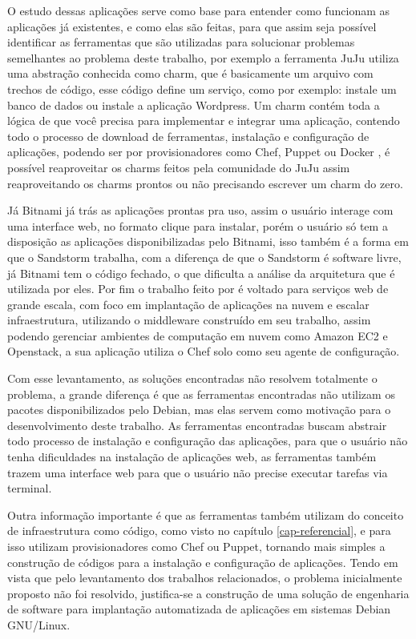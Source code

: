 O estudo dessas aplicações serve como base para entender como funcionam as aplicações
já existentes, e como elas são feitas, para que assim seja possível identificar
as ferramentas que são
utilizadas para solucionar problemas semelhantes ao problema deste
trabalho, por exemplo a ferramenta JuJu utiliza uma abstração conhecida como charm,
que é basicamente um arquivo com trechos de código, esse código define um serviço, como por exemplo: instale um banco de dados ou instale a aplicação Wordpress. Um charm
contém toda a lógica de que você precisa para implementar e integrar uma aplicação,
contendo todo o processo de download de ferramentas, instalação e configuração de
aplicações, podendo ser por provisionadores como Chef, Puppet ou Docker \cite{juju},
é possível reaproveitar os charms feitos pela comunidade do JuJu assim
reaproveitando os charms prontos ou não precisando escrever um charm do zero.

Já Bitnami já trás as aplicações
prontas pra uso, assim o usuário interage com uma interface web, no formato clique para instalar, porém
o usuário só tem a disposição as aplicações disponibilizadas pelo Bitnami, isso
também é a forma em que o Sandstorm trabalha, com a diferença de que o Sandstorm é
software livre, já Bitnami tem o código fechado, o que dificulta a análise da arquitetura
que é utilizada por eles. Por fim o trabalho feito por \cite{leo2014} é voltado
para serviços web de grande escala, com foco em implantação de aplicações na
nuvem e escalar infraestrutura, utilizando o middleware construído em seu trabalho,
 assim podendo gerenciar ambientes de computação em nuvem
 como Amazon EC2 e Openstack, a sua aplicação utiliza o Chef solo como seu agente de configuração.

Com esse levantamento, as soluções encontradas não resolvem totalmente
o problema, a grande diferença é que as ferramentas encontradas não utilizam os pacotes
disponibilizados pelo Debian, mas elas servem como motivação para o desenvolvimento
deste trabalho. As ferramentas encontradas buscam
abstrair todo processo de instalação e configuração das aplicações, para que o
usuário não tenha dificuldades na instalação de aplicações web, as ferramentas também
trazem uma interface web para que o usuário não precise executar tarefas via terminal.

Outra informação importante é que as ferramentas também utilizam do conceito de
infraestrutura como código, como visto no capítulo \ref{cap-referencial}, e para
isso utilizam provisionadores como Chef ou Puppet, tornando mais simples a
construção de códigos para a instalação e configuração de aplicações.
Tendo em vista que pelo levantamento dos trabalhos relacionados, o problema inicialmente
proposto não foi resolvido, justifica-se a construção de uma solução de engenharia
de software para implantação automatizada de aplicações em sistemas Debian GNU/Linux.

